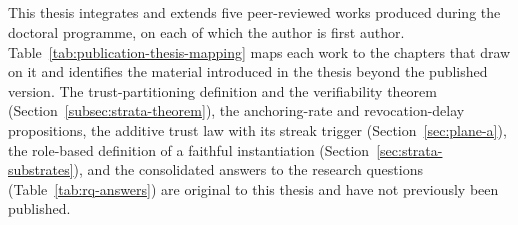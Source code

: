 \begin{titlepage}
\section*{\Huge{}}

\vspace{0.5cm}
\large

This thesis integrates and extends five peer-reviewed works produced during the doctoral programme, on each of which the author is first author. Table~\ref{tab:publication-thesis-mapping} maps each work to the chapters that draw on it and identifies the material introduced in the thesis beyond the published version. The trust-partitioning definition and the verifiability theorem (Section~\ref{subsec:strata-theorem}), the anchoring-rate and revocation-delay propositions, the additive trust law with its streak trigger (Section~\ref{sec:plane-a}), the role-based definition of a faithful instantiation (Section~\ref{sec:strata-substrates}), and the consolidated answers to the research questions (Table~\ref{tab:rq-answers}) are original to this thesis and have not previously been published.


\end{titlepage}
